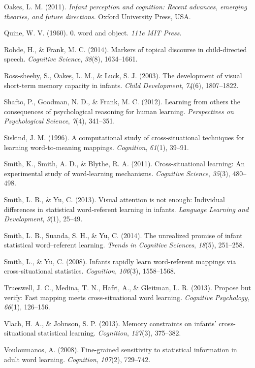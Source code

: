 \documentclass[authoryear, review]{elsarticle}
\begin{document}
Oakes, L. M. (2011). \emph{Infant perception and cognition: Recent
advances, emerging theories, and future directions}. Oxford University
Press, USA.

Quine, W. V. (1960). 0. word and object. \emph{111e MIT Press}.

Rohde, H., \& Frank, M. C. (2014). Markers of topical discourse in
child-directed speech. \emph{Cognitive Science}, \emph{38}(8),
1634--1661.

Ross-sheehy, S., Oakes, L. M., \& Luck, S. J. (2003). The development of
visual short-term memory capacity in infants. \emph{Child Development},
\emph{74}(6), 1807--1822.

Shafto, P., Goodman, N. D., \& Frank, M. C. (2012). Learning from others
the consequences of psychological reasoning for human learning.
\emph{Perspectives on Psychological Science}, \emph{7}(4), 341--351.

Siskind, J. M. (1996). A computational study of cross-situational
techniques for learning word-to-meaning mappings. \emph{Cognition},
\emph{61}(1), 39--91.

Smith, K., Smith, A. D., \& Blythe, R. A. (2011). Cross-situational
learning: An experimental study of word-learning mechanisms.
\emph{Cognitive Science}, \emph{35}(3), 480--498.

Smith, L. B., \& Yu, C. (2013). Visual attention is not enough:
Individual differences in statistical word-referent learning in infants.
\emph{Language Learning and Development}, \emph{9}(1), 25--49.

Smith, L. B., Suanda, S. H., \& Yu, C. (2014). The unrealized promise of
infant statistical word--referent learning. \emph{Trends in Cognitive
Sciences}, \emph{18}(5), 251--258.

Smith, L., \& Yu, C. (2008). Infants rapidly learn word-referent
mappings via cross-situational statistics. \emph{Cognition},
\emph{106}(3), 1558--1568.

Trueswell, J. C., Medina, T. N., Hafri, A., \& Gleitman, L. R. (2013).
Propose but verify: Fast mapping meets cross-situational word learning.
\emph{Cognitive Psychology}, \emph{66}(1), 126--156.

Vlach, H. A., \& Johnson, S. P. (2013). Memory constraints on infants'
cross-situational statistical learning. \emph{Cognition}, \emph{127}(3),
375--382.

Vouloumanos, A. (2008). Fine-grained sensitivity to statistical
information in adult word learning. \emph{Cognition}, \emph{107}(2),
729--742.
\end{document}
